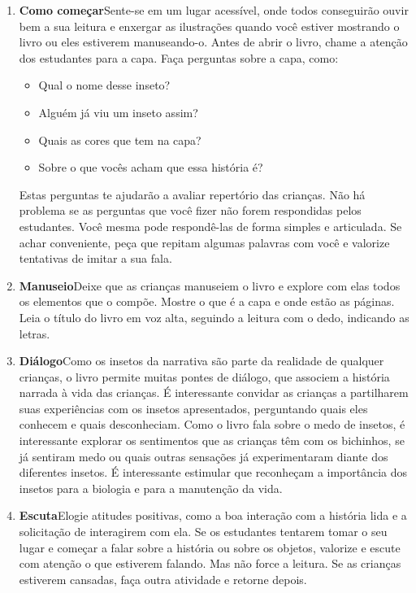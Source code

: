 \documentclass[11pt]{extarticle}
\begin{document}
\begin{enumerate}
\item \textbf{Como começar}\quad Sente-se em um lugar acessível, 
onde todos conseguirão ouvir bem a sua leitura e enxergar as ilustrações 
quando você estiver mostrando o livro ou eles estiverem manuseando-o. 
Antes de abrir o livro, chame a atenção dos estudantes para a capa. 
Faça perguntas sobre a capa, como: 

\begin{itemize}
\item Qual o nome desse inseto?
\item Alguém já viu um inseto assim?
\item Quais as cores que tem na capa?
\item Sobre o que vocês acham que essa história é?
\end{itemize}

Estas perguntas te ajudarão a avaliar repertório das crianças. 
Não há problema se as perguntas que você fizer não forem respondidas pelos 
estudantes. Você mesma pode respondê-las de forma simples e articulada. Se achar 
conveniente, peça que repitam algumas palavras com você e valorize tentativas 
de imitar a sua fala. 
 
\item \textbf{Manuseio}\quad Deixe que as crianças manuseiem o livro 
e explore com elas todos os elementos que o compõe. Mostre o que é a 
capa e onde estão as páginas. Leia o título do livro em voz alta, seguindo 
a leitura com o dedo, indicando as letras. 

\item \textbf{Diálogo}\quad Como os insetos da narrativa são parte da realidade de qualquer crianças, o livro permite muitas pontes de diálogo, que associem a história narrada à vida das crianças. É interessante convidar as crianças a partilharem suas experiências com os insetos apresentados, perguntando quais eles conhecem e quais desconheciam.
Como o livro fala sobre o medo de insetos, é interessante explorar os sentimentos que as crianças têm com os bichinhos, se já sentiram medo ou quais outras sensações já experimentaram diante dos diferentes insetos. É interessante estimular que reconheçam a importância dos insetos para a biologia e para a manutenção da vida.

\item \textbf{Escuta}\quad Elogie atitudes positivas, como 
a boa interação com a história lida e a solicitação de interagirem com ela. Se os estudantes tentarem tomar o seu lugar e começar a falar sobre a história ou sobre os objetos, valorize e escute com atenção o que estiverem falando. Mas não 
force a leitura. Se as crianças estiverem cansadas, faça outra atividade 
e retorne depois. 


\end{enumerate}
\end{document}
